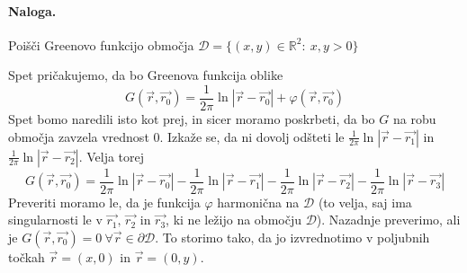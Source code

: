 \documentclass[a4paper]{article}
\newcommand{\vct}[1]{\overrightarrow{#1}}
\newcommand{\R}{\mathbb{R}}
\begin{document}
\paragraph{Naloga.} Poišči Greenovo funkcijo območja $\mathcal{D} = \{(x, y)\in\R^2\colon~x,y>0\}$
\begin{figure}[h!]
    \centering
\end{figure}
\newpage
Spet pričakujemo, da bo Greenova funkcija oblike
$$G(\vct{r}, \vct{r_0}) = \frac{1}{2\pi} \ln\left|\vct{r}-\vct{r_0}\right| + \varphi(\vct{r}, \vct{r_0})$$
Spet bomo naredili isto kot prej, in sicer moramo poskrbeti, da bo $G$ na robu območja zavzela vrednost 0. Izkaže se, da ni dovolj odšteti le $\displaystyle{\frac{1}{2\pi}\ln\left|\vct{r} - \vct{r_1}\right|}$ in $\frac{1}{2\pi}\ln\left|\vct{r} - \vct{r_2}\right|$. Velja torej
$$G(\vct{r}, \vct{r_0}) = \frac{1}{2\pi}\ln\left|\vct{r} - \vct{r_0}\right| - \frac{1}{2\pi}\ln\left|\vct{r} - \vct{r_1}\right| - \frac{1}{2\pi}\ln\left|\vct{r} - \vct{r_2}\right| - \frac{1}{2\pi}\ln\left|\vct{r} - \vct{r_3}\right|$$
Preveriti moramo le, da je funkcija $\varphi$ harmonična na $\mathcal{D}$ (to velja, saj ima singularnosti le v $\vct{r_1},\,\vct{r_2}$ in $\vct{r_3}$, ki ne ležijo na območju $\mathcal{D}$). Nazadnje preverimo, ali je $G(\vct{r}, \vct{r_0}) = 0~\forall\vct{r}\in\partial\mathcal{D}$.
To storimo tako, da jo izvrednotimo v poljubnih točkah $\vct{r} = (x, 0)$ in $\vct{r} = (0, y)$.
\end{document}
